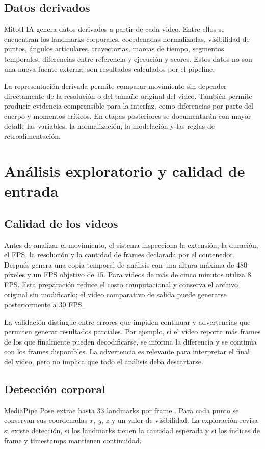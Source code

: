 \documentclass[12pt,a4paper]{article}
\begin{document}
\subsection{Datos derivados}
Mitotl IA genera datos derivados a partir de cada video. Entre ellos se encuentran los landmarks corporales, coordenadas normalizadas, visibilidad de puntos, ángulos articulares, trayectorias, marcas de tiempo, segmentos temporales, diferencias entre referencia y ejecución y scores. Estos datos no son una nueva fuente externa: son resultados calculados por el pipeline.

La representación derivada permite comparar movimiento sin depender directamente de la resolución o del tamaño original del video. También permite producir evidencia comprensible para la interfaz, como diferencias por parte del cuerpo y momentos críticos. En etapas posteriores se documentarán con mayor detalle las variables, la normalización, la modelación y las reglas de retroalimentación.

\section{Análisis exploratorio y calidad de entrada}
\subsection{Calidad de los videos}
Antes de analizar el movimiento, el sistema inspecciona la extensión, la duración, el FPS, la resolución y la cantidad de frames declarada por el contenedor. Después genera una copia temporal de análisis con una altura máxima de 480 píxeles y un FPS objetivo de 15. Para videos de más de cinco minutos utiliza 8 FPS. Esta preparación reduce el costo computacional y conserva el archivo original sin modificarlo; el video comparativo de salida puede generarse posteriormente a 30 FPS.

La validación distingue entre errores que impiden continuar y advertencias que permiten generar resultados parciales. Por ejemplo, si el video reporta más frames de los que finalmente pueden decodificarse, se informa la diferencia y se continúa con los frames disponibles. La advertencia es relevante para interpretar el final del video, pero no implica que todo el análisis deba descartarse.
\subsection{Detección corporal}
MediaPipe Pose extrae hasta 33 landmarks por frame \cite{mediapipe}. Para cada punto se conservan sus coordenadas $x$, $y$, $z$ y un valor de visibilidad. La exploración revisa si existe detección, si los landmarks tienen la cantidad esperada y si los índices de frame y timestamps mantienen continuidad.
\end{document}
